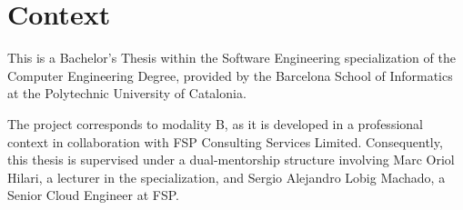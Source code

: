 \section{Context}

This is a Bachelor's Thesis within the Software Engineering specialization of the Computer Engineering Degree, provided by the Barcelona School of Informatics at the Polytechnic University of Catalonia. 

The project corresponds to modality B, as it is developed in a professional context in collaboration with FSP Consulting Services Limited. Consequently, this thesis is supervised under a dual-mentorship structure involving Marc Oriol Hilari, a lecturer in the specialization, and Sergio Alejandro Lobig Machado, a Senior Cloud Engineer at FSP.






\newpage